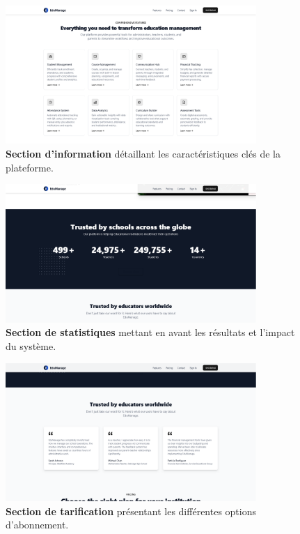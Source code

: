 \begin{figure}[H]
  \centering
  \includegraphics[width=0.85\textwidth,keepaspectratio]{pfe-pics/landing/info.png}
  \caption{\textbf{Section d'information} détaillant les caractéristiques clés de la plateforme.}
  \label{fig:landing_info}
\end{figure}

\begin{figure}[H]
  \centering
  \includegraphics[width=0.85\textwidth,keepaspectratio]{pfe-pics/landing/stats.png}
  \caption{\textbf{Section de statistiques} mettant en avant les résultats et l'impact du système.}
  \label{fig:landing_stats}
\end{figure}

\begin{figure}[H]
  \centering
  \includegraphics[width=0.85\textwidth,keepaspectratio]{pfe-pics/landing/Screenshot 2025-06-09 at 23-12-47 Vite React TS.png}
  \caption{\textbf{Section de tarification} présentant les différentes options d'abonnement.}
  \label{fig:landing_pricing}
\end{figure}

